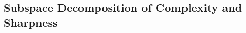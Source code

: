 \documentclass[10pt]{article} %
\begin{document}





\subsection{Subspace Decomposition of Complexity and Sharpness}
\end{document}

